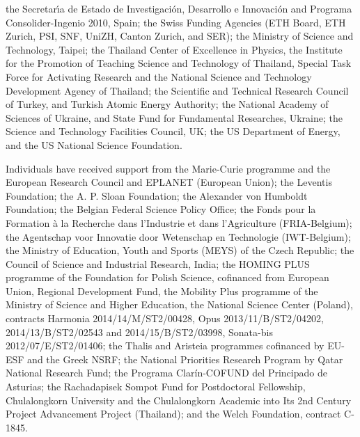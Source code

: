 \begin{acknowledgments}
the Secretar\'{\i}a de Estado de Investigaci\'on, Desarrollo e Innovaci\'on and Programa Consolider-Ingenio 2010, Spain; the Swiss Funding Agencies (ETH Board, ETH Zurich, PSI, SNF, UniZH, Canton Zurich, and SER); the Ministry of Science and Technology, Taipei; the Thailand Center of Excellence in Physics, the Institute for the Promotion of Teaching Science and Technology of Thailand, Special Task Force for Activating Research and the National Science and Technology Development Agency of Thailand; the Scientific and Technical Research Council of Turkey, and Turkish Atomic Energy Authority; the National Academy of Sciences of Ukraine, and State Fund for Fundamental Researches, Ukraine; the Science and Technology Facilities Council, UK; the US Department of Energy, and the US National Science Foundation.

Individuals have received support from the Marie-Curie programme and the European Research Council and EPLANET (European Union); the Leventis Foundation; the A. P. Sloan Foundation; the Alexander von Humboldt Foundation; the Belgian Federal Science Policy Office; the Fonds pour la Formation \`a la Recherche dans l'Industrie et dans l'Agriculture (FRIA-Belgium); the Agentschap voor Innovatie door Wetenschap en Technologie (IWT-Belgium); the Ministry of Education, Youth and Sports (MEYS) of the Czech Republic; the Council of Science and Industrial Research, India; the HOMING PLUS programme of the Foundation for Polish Science, cofinanced from European Union, Regional Development Fund, the Mobility Plus programme of the Ministry of Science and Higher Education, the National Science Center (Poland), contracts Harmonia 2014/14/M/ST2/00428, Opus 2013/11/B/ST2/04202, 2014/13/B/ST2/02543 and 2014/15/B/ST2/03998, Sonata-bis 2012/07/E/ST2/01406; the Thalis and Aristeia programmes cofinanced by EU-ESF and the Greek NSRF; the National Priorities Research Program by Qatar National Research Fund; the Programa Clar\'in-COFUND del Principado de Asturias; the Rachadapisek Sompot Fund for Postdoctoral Fellowship, Chulalongkorn University and the Chulalongkorn Academic into Its 2nd Century Project Advancement Project (Thailand); and the Welch Foundation, contract C-1845.
\end{acknowledgments}



